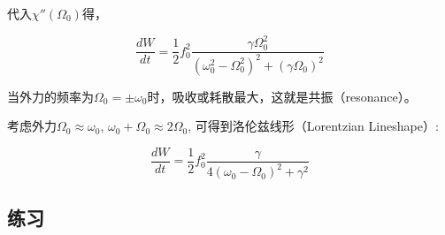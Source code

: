 代入$\chi''(\Omega_0)$得，

\begin{equation}
\frac{dW}{dt} = \frac{1}{2} f_0^2  \frac{\gamma \Omega_0^2 }{ ( \omega_0^2 - \Omega_0^2  )^2 +(\gamma \Omega_0)^2 }
\end{equation}

当外力的频率为$\Omega_0 = \pm \omega_0$时，吸收或耗散最大，这就是共振（resonance）。

考虑外力$\Omega_0 \approx \omega_0$, $\omega_0 +\Omega_0 \approx 2\Omega_0 $, 可得到洛伦兹线形（Lorentzian Lineshape）:

\begin{equation}
\frac{dW}{dt} = \frac{1}{2}f_0^2 \frac{\gamma}{ 4 (\omega_0 - \Omega_0)^2 + \gamma^2}
\end{equation}

\subsection*{练习}

